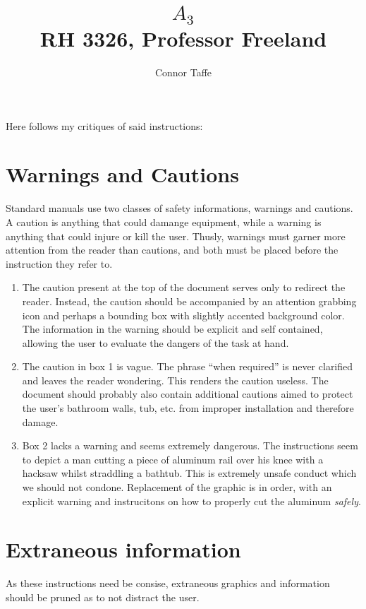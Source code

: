 \documentclass[11pt]{article}
\title{
	$A_{3}$ \\
	\large{RH 3326, Professor Freeland}
}
\author{Connor Taffe}
\begin{document}
\maketitle

Here follows my critiques of said instructions:

\section{Warnings and Cautions}

Standard manuals use two classes of safety informations, warnings and cautions. A caution is anything that could damange equipment, while a warning is anything that could injure or kill the user. Thusly, warnings must garner more attention from the reader than cautions, and both must be placed before the instruction they refer to.

\begin{enumerate}
	\item{
		The caution present at the top of the document serves only to redirect the reader. Instead, the caution should be accompanied by an attention grabbing icon and perhaps a bounding box with slightly accented background color. The information in the warning should be explicit and self contained, allowing the user to evaluate the dangers of the task at hand.
	}
	\item{
		The caution in box 1 is vague. The phrase ``when required'' is never clarified and leaves the reader wondering. This renders the caution useless.
		The document should probably also contain additional cautions aimed to protect the user's bathroom walls, tub, etc. from improper installation and therefore damage.
	}
	\item{
		Box 2 lacks a warning and seems extremely dangerous. The instructions seem to depict a man cutting a piece of aluminum rail over his knee with a hacksaw whilst straddling a bathtub. This is extremely unsafe conduct which we should not condone. Replacement of the graphic is in order, with an explicit warning and instrucitons on how to properly cut the aluminum {\it safely}.
	}
\end{enumerate}

\section{Extraneous information}

As these instructions need be consise, extraneous graphics and information should be pruned as to not distract the user.
\end{document}
